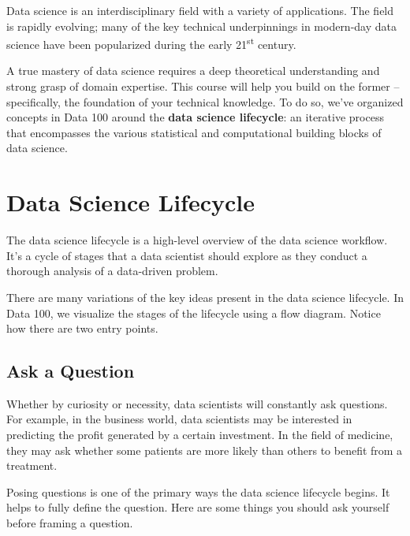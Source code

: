\documentclass[
  letterpaper,
  DIV=11,
  numbers=noendperiod]{scrreprt}
\begin{document}
Data science is an interdisciplinary field with a variety of
applications. The field is rapidly evolving; many of the key technical
underpinnings in modern-day data science have been popularized during
the early 21\textsuperscript{st} century.

A true mastery of data science requires a deep theoretical understanding
and strong grasp of domain expertise. This course will help you build on
the former -- specifically, the foundation of your technical knowledge.
To do so, we've organized concepts in Data 100 around the \textbf{data
science lifecycle}: an iterative process that encompasses the various
statistical and computational building blocks of data science.

\hypertarget{data-science-lifecycle}{%
\section{Data Science Lifecycle}\label{data-science-lifecycle}}

The data science lifecycle is a high-level overview of the data science
workflow. It's a cycle of stages that a data scientist should explore as
they conduct a thorough analysis of a data-driven problem.

There are many variations of the key ideas present in the data science
lifecycle. In Data 100, we visualize the stages of the lifecycle using a
flow diagram. Notice how there are two entry points.

\hypertarget{ask-a-question}{%
\subsection{Ask a Question}\label{ask-a-question}}

Whether by curiosity or necessity, data scientists will constantly ask
questions. For example, in the business world, data scientists may be
interested in predicting the profit generated by a certain investment.
In the field of medicine, they may ask whether some patients are more
likely than others to benefit from a treatment.

Posing questions is one of the primary ways the data science lifecycle
begins. It helps to fully define the question. Here are some things you
should ask yourself before framing a question.
\end{document}
